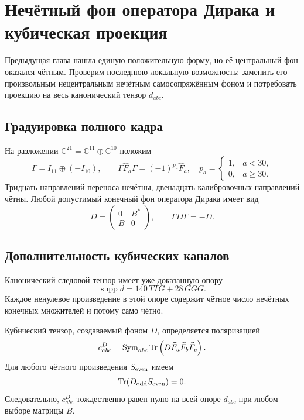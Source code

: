 \chapter{Нечётный фон оператора Дирака и кубическая проекция}
\label{ch:v8-baryon-noncentral-odd-dirac-background-projection-no-go-gate}

Предыдущая глава нашла единую положительную форму, но её центральный фон
оказался чётным. Проверим последнюю локальную возможность: заменить его
произвольным нецентральным нечётным самосопряжённым фоном и потребовать
проекцию на весь канонический тензор $d_{abc}$.

\section{Градуировка полного кадра}

На разложении $\mathbb C^{21}=\mathbb C^{11}\oplus\mathbb C^{10}$ положим
\begin{equation}
 \Gamma=I_{11}\oplus(-I_{10}),\qquad
 \Gamma\widehat F_a\Gamma=(-1)^{p_a}\widehat F_a,
 \quad
 p_a=\begin{cases}1,&a<30,\\0,&a\ge30.\end{cases}
 \label{eq:v8-baryon-full-frame-finite-parity}
\end{equation}
Тридцать направлений переноса нечётны, двенадцать калибровочных направлений
чётны. Любой допустимый конечный фон оператора Дирака имеет вид
\begin{equation}
 D=\begin{pmatrix}0&B^*\\B&0\end{pmatrix},
 \qquad \Gamma D\Gamma=-D.
 \label{eq:v8-baryon-general-odd-dirac-background}
\end{equation}

\section{Дополнительность кубических каналов}

Канонический следовой тензор имеет уже доказанную опору
\begin{equation}
 \operatorname{supp}d=140\,TTG+28\,GGG.
 \label{eq:v8-baryon-canonical-cubic-even-support}
\end{equation}
Каждое ненулевое произведение в этой опоре содержит чётное число нечётных
конечных множителей и потому само чётно.

Кубический тензор, создаваемый фоном $D$, определяется поляризацией
\begin{equation}
 c^{D}_{abc}
 =\operatorname{Sym}_{abc}\operatorname{Tr}
 \left(D\widehat F_a\widehat F_b\widehat F_c\right).
 \label{eq:v8-baryon-odd-background-cubic-tensor}
\end{equation}
Для любого чётного произведения $S_{\rm even}$ имеем
\begin{equation}
 \operatorname{Tr}(D_{\rm odd}S_{\rm even})=0.
 \label{eq:v8-baryon-odd-even-trace-orthogonality}
\end{equation}
Следовательно, $c^D_{abc}$ тождественно равен нулю на всей опоре $d_{abc}$
при любом выборе матрицы $B$.

